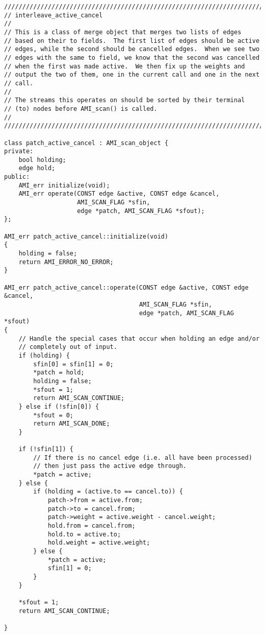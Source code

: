 \begin{verbatim}
////////////////////////////////////////////////////////////////////////
// interleave_active_cancel
//
// This is a class of merge object that merges two lists of edges
// based on their to fields.  The first list of edges should be active
// edges, while the second should be cancelled edges.  When we see two
// edges with the same to field, we know that the second was cancelled
// when the first was made active.  We then fix up the weights and
// output the two of them, one in the current call and one in the next
// call.
//
// The streams this operates on should be sorted by their terminal
// (to) nodes before AMI_scan() is called.
// 
////////////////////////////////////////////////////////////////////////

class patch_active_cancel : AMI_scan_object {
private:
    bool holding;
    edge hold;
public:
    AMI_err initialize(void);
    AMI_err operate(CONST edge &active, CONST edge &cancel,
                    AMI_SCAN_FLAG *sfin,
                    edge *patch, AMI_SCAN_FLAG *sfout);
};

AMI_err patch_active_cancel::initialize(void)
{
    holding = false;
    return AMI_ERROR_NO_ERROR;
}

AMI_err patch_active_cancel::operate(CONST edge &active, CONST edge &cancel,
                                     AMI_SCAN_FLAG *sfin,
                                     edge *patch, AMI_SCAN_FLAG *sfout)
{
    // Handle the special cases that occur when holding an edge and/or
    // completely out of input.
    if (holding) {
        sfin[0] = sfin[1] = 0;
        *patch = hold;
        holding = false;
        *sfout = 1;
        return AMI_SCAN_CONTINUE;
    } else if (!sfin[0]) {
        *sfout = 0;
        return AMI_SCAN_DONE;
    }

    if (!sfin[1]) {
        // If there is no cancel edge (i.e. all have been processed)
        // then just pass the active edge through.
        *patch = active;
    } else {
        if (holding = (active.to == cancel.to)) {
            patch->from = active.from;
            patch->to = cancel.from;
            patch->weight = active.weight - cancel.weight;
            hold.from = cancel.from;
            hold.to = active.to;
            hold.weight = active.weight;
        } else {
            *patch = active;
            sfin[1] = 0;
        }
    }

    *sfout = 1;
    return AMI_SCAN_CONTINUE;

}
\end{verbatim}

